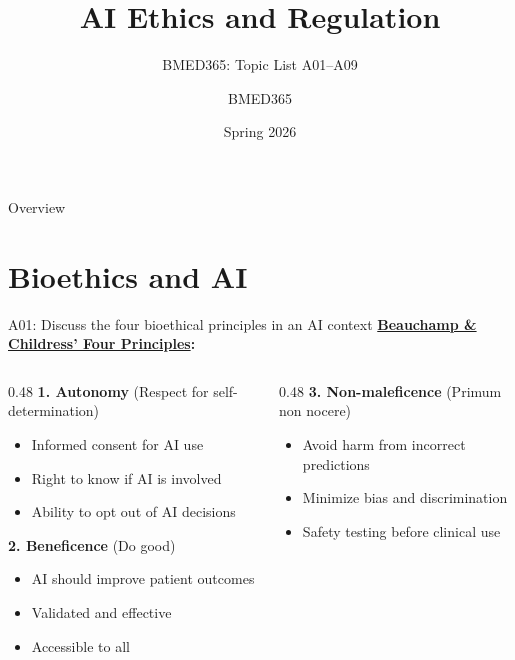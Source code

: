 \documentclass[aspectratio=169, 10pt]{beamer}
\title{AI Ethics and Regulation}
\subtitle{BMED365: Topic List A01--A09}
\author{BMED365}
\date{Spring 2026}
\begin{document}
\begin{frame}
    \titlepage
\end{frame}

\begin{frame}{Overview}
    \tableofcontents
\end{frame}

\section{Bioethics and AI}

\begin{frame}{A01: Discuss the four bioethical principles in an AI context}
    \textbf{\href{https://en.wikipedia.org/wiki/Principlism}{Beauchamp \& Childress' Four Principles}:}
    
    \vspace{0.3cm}
    \begin{columns}[T]
        \begin{column}{0.48\textwidth}
            \textbf{1. Autonomy} (Respect for self-determination)
            \begin{itemize}
                \item Informed consent for AI use
                \item Right to know if AI is involved
                \item Ability to opt out of AI decisions
            \end{itemize}
            
            \vspace{0.3cm}
            \textbf{2. Beneficence} (Do good)
            \begin{itemize}
                \item AI should improve patient outcomes
                \item Validated and effective
                \item Accessible to all
            \end{itemize}
        \end{column}
        \begin{column}{0.48\textwidth}
            \textbf{3. Non-maleficence} (Primum non nocere)
            \begin{itemize}
                \item Avoid harm from incorrect predictions
                \item Minimize bias and discrimination
                \item Safety testing before clinical use
            \end{itemize}
            

\end{column}
\end{columns}
\end{frame}
\end{document}
